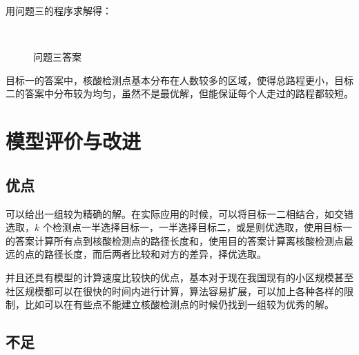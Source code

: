\documentclass{cumcmthesis}
\begin{document}
用问题三的程序求解得：

\begin{figure}[H]
	\centering
	\\	
	\caption{问题三答案}
\end{figure}

目标一的答案中，核酸检测点基本分布在人数较多的区域，使得总路程更小，目标二的答案中分布较为均匀，虽然不是最优解，但能保证每个人走过的路程都较短。

\section{模型评价与改进}

\subsection{优点}

可以给出一组较为精确的解。在实际应用的时候，可以将目标一二相结合，如交错选取，$k$ 个检测点一半选择目标一，一半选择目标二，或是则优选取，使用目标一的答案计算所有点到核酸检测点的路径长度和，使用目的答案计算离核酸检测点最远的点的路径长度，而后两者比较和对方的差异，择优选取。

并且还具有模型的计算速度比较快的优点，基本对于现在我国现有的小区规模甚至社区规模都可以在很快的时间内进行计算，算法容易扩展，可以加上各种各样的限制，比如可以在有些点不能建立核酸检测点的时候仍找到一组较为优秀的解。

\subsection{不足}
\end{document}
